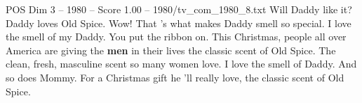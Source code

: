 \begin{textsample}{POS Dim 3 – 1980 – Score 1.00 – 1980/tv\_com\_1980\_8.txt}  \label{ex:f3_pos_058}
Will Daddy like it?
Daddy loves Old Spice.
Wow!
That 's what makes Daddy smell so special.
I love the smell of my Daddy.
You put the ribbon on.
This Christmas, people all over America are giving the \textbf{men} in their lives the classic scent of Old Spice.
The clean, fresh, masculine scent so many women love.
I love the smell of Daddy.
And so does Mommy.
For a Christmas gift he 'll really love, the classic scent of Old Spice.

\end{textsample}
